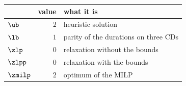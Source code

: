 \begin{center}\small
\begin{tabular}{lrl}
\toprule
 & value & what it is \\
\midrule
$\ub$ & $2$ & heuristic solution \\
$\lb$ & $1$ & parity of the durations on three CDs \\
$\zlp$ & $0$ & relaxation without the bounds \\
$\zlpp$ & $0$ & relaxation with the bounds \\
$\zmilp$ & $2$ & optimum of the MILP \\
\bottomrule
\end{tabular}
\end{center}
